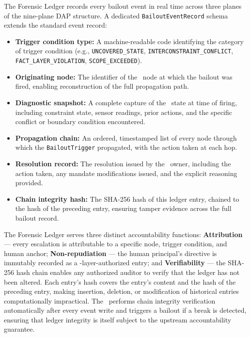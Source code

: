 The Forensic Ledger records every bailout event in real time across three planes of the nine-plane DAP structure. A dedicated \texttt{BailoutEventRecord} schema extends the standard event record:

\begin{itemize}
\item \textbf{Trigger condition type:} A machine-readable code identifying the category of trigger condition (e.g., \texttt{UNCOVERED\_STATE}, \texttt{INTERCONSTRAINT\_CONFLICT}, \texttt{FACT\_LAYER\_VIOLATION}, \texttt{SCOPE\_EXCEEDED}).
\item \textbf{Originating node:} The identifier of the \bounds\ node at which the bailout was fired, enabling reconstruction of the full propagation path.
\item \textbf{Diagnostic snapshot:} A complete capture of the \bounds\ state at time of firing, including constraint state, sensor readings, prior actions, and the specific conflict or boundary condition encountered.
\item \textbf{Propagation chain:} An ordered, timestamped list of every node through which the \texttt{BailoutTrigger} propagated, with the action taken at each hop.
\item \textbf{Resolution record:} The resolution issued by the \purpose\ owner, including the action taken, any mandate modifications issued, and the explicit reasoning provided.
\item \textbf{Chain integrity hash:} The SHA-256 hash of this ledger entry, chained to the hash of the preceding entry, ensuring tamper evidence across the full bailout record.
\end{itemize}

The Forensic Ledger serves three distinct accountability functions: \textbf{Attribution} --- every escalation is attributable to a specific node, trigger condition, and human anchor; \textbf{Non-repudiation} --- the human principal's directive is immutably recorded as a \purpose-layer-authorized entry; and \textbf{Verifiability} --- the SHA-256 hash chain enables any authorized auditor to verify that the ledger has not been altered. Each entry's hash covers the entry's content and the hash of the preceding entry, making insertion, deletion, or modification of historical entries computationally impractical. The \fact\ performs chain integrity verification automatically after every event write and triggers a bailout if a break is detected, ensuring that ledger integrity is itself subject to the upstream accountability guarantee.

